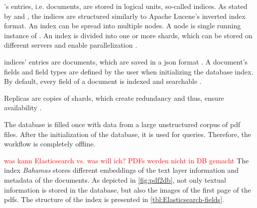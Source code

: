 \databaseName{}'s entries, i.e. documents, are stored in logical units, so-called indices.
As stated by \citeauthor{Elasticsearch2019} and \citeauthor{Elasticsearch2017}, the indices are structured similarly to Apache Lucene's inverted index format.
An index can be spread into multiple nodes.
A node is single running instance of \databaseName{} \cite{Elasticsearch2019}.
An index is divided into one or more shards, which can be stored on different servers and enable parallelization \cite{Elasticsearch2019}.

\databaseName{} indices' entries are documents, which are saved in a \ac{json} format \cite{Elasticsearch2017}.
A document's fields and field types are defined by the user when initializing the database index.
By default, every field of a document is indexed and searchable \cite{Elasticsearch2019}.

Replicas are copies of shards, which create redundancy and thus, ensure availability \cite{Elasticsearch2019}.

The database is filled once with data from a large unstructured corpus of \ac{pdf} files.
After the initialization of the database, it is used for queries. 
Therefore, the workflow is completely offline.

\textcolor{red}{was kann Elasticsearch vs. was will ich? PDFs werden nicht in DB gemacht}
The index \textit{Bahamas} stores different embeddings of the text layer information and metadata of the documents.
As depicted in \autoref{fig:pdf2db}, not only textual information is stored in the database, but also the images of the first page of the \acp{pdf}.
The structure of the index is presented in \autoref{tbl:Elasticsearch-fields}.

